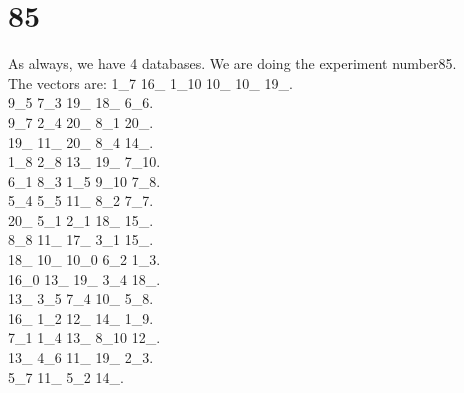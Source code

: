 \chapter{85}
\indent As always, we have 4 databases. We are doing the experiment number85.\\
The vectors are:
1\_7 16\_ 1\_10 10\_ 10\_ 19\_.\\9\_5 7\_3 19\_ 18\_ 6\_6.\\9\_7 2\_4 20\_ 8\_1 20\_.\\19\_ 11\_ 20\_ 8\_4 14\_.\\1\_8 2\_8 13\_ 19\_ 7\_10.\\6\_1 8\_3 1\_5 9\_10 7\_8.\\5\_4 5\_5 11\_ 8\_2 7\_7.\\20\_ 5\_1 2\_1 18\_ 15\_.\\8\_8 11\_ 17\_ 3\_1 15\_.\\18\_ 10\_ 10\_0 6\_2 1\_3.\\16\_0 13\_ 19\_ 3\_4 18\_.\\13\_ 3\_5 7\_4 10\_ 5\_8.\\16\_ 1\_2 12\_ 14\_ 1\_9.\\7\_1 1\_4 13\_ 8\_10 12\_.\\13\_ 4\_6 11\_ 19\_ 2\_3.\\5\_7 11\_ 5\_2 14\_.\\